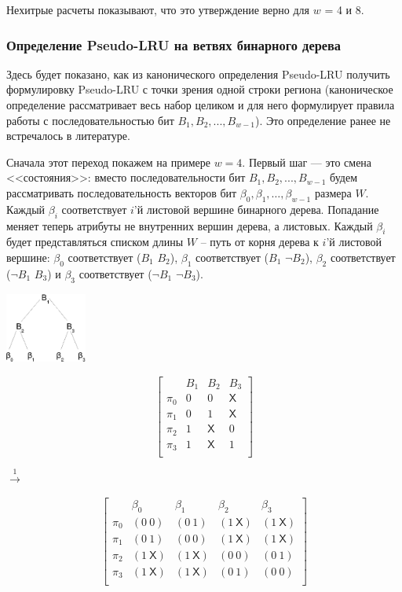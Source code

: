 \documentclass[14pt]{extreport}
\newcommand{\PseudoLRU}{\textsf{Pseudo-LRU}\xspace}
\begin{document}
Нехитрые расчеты показывают, что это утверждение верно для $w$ = 4 и 8.

\subsubsection{Определение \PseudoLRU на ветвях бинарного
дерева}\label{sec:PseudoLRUonBranches}

Здесь будет показано, как из канонического определения \PseudoLRU
получить формулировку \PseudoLRU с точки зрения одной строки региона
(каноническое определение рассматривает весь набор целиком и
для него формулирует правила работы с последовательностью бит $B_1,
B_2, ..., B_{w{-}1}$). Это определение ранее не встречалось в
литературе.

Сначала этот переход покажем на примере $w=4$. Первый шаг --- это
смена <<состояния>>: вместо последовательности бит $B_1, B_2, ...,
B_{w-1}$ будем рассматривать последовательность векторов бит
$\beta_0, \beta_1, \dots, \beta_{w-1}$ размера $W$. Каждый $\beta_i$
соответствует $i$'й листовой вершине бинарного дерева. Попадание
меняет теперь атрибуты не внутренних вершин дерева, а листовых.
Каждый $\beta_i$ будет представляться списком длины $W$ -- путь от
корня дерева к $i$'й листовой вершине: $\beta_0$ соответствует
($B_1$ $B_2$), $\beta_1$ соответствует ($B_1$ $\neg B_2$), $\beta_2$
соответствует ($\neg B_1$ $B_3$) и $\beta_3$ соответствует ($\neg
B_1$ $ \neg B_3$).\\[0.5cm]

\parbox{0.2\textwidth}{ \centering
  \includegraphics[width=0.2\textwidth]{1.review/btree}
}
\parbox{0.25\textwidth}{
$$ \left[
  \begin{array}{c|ccc}
          & B_1 & B_2 & B_3 \\ \hline
    \pi_0 & 0 & 0 & \textsf{X} \\
    \pi_1 & 0 & 1 & \textsf{X} \\
    \pi_2 & 1 & \textsf{X} & 0 \\
    \pi_3 & 1 & \textsf{X} & 1 \\
  \end{array}
\right]
$$
} $\stackrel{1}{\longrightarrow}$ %
\parbox{0.4\textwidth}{
$$ \left[
  \begin{array}{c|cccc}
          & \beta_0 & \beta_1 & \beta_2 & \beta_3 \\ \hline
    \pi_0 & (0~0) & (0~1) & (1~\textsf{X}) & (1~\textsf{X}) \\
    \pi_1 & (0~1) & (0~0) & (1~\textsf{X}) & (1~\textsf{X}) \\
    \pi_2 & (1~\textsf{X}) & (1~\textsf{X}) & (0~0) & (0~1) \\
    \pi_3 & (1~\textsf{X}) & (1~\textsf{X}) & (0~1) & (0~0) \\
  \end{array}
\right]
$$
}
\end{document}
